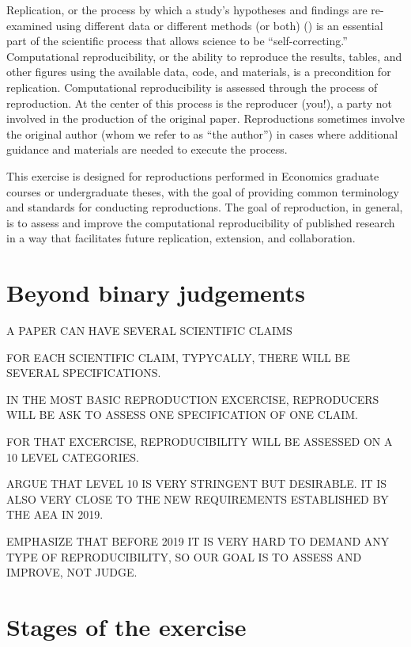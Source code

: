 \documentclass[]{book}
\begin{document}
Replication, or the process by which a study's hypotheses and findings are re-examined using different data or different methods (or both) (\citet{King95}) is an essential part of the scientific process that allows science to be ``self-correcting.'' Computational reproducibility, or the ability to reproduce the results, tables, and other figures using the available data, code, and materials, is a precondition for replication. Computational reproducibility is assessed through the process of reproduction. At the center of this process is the reproducer (you!), a party not involved in the production of the original paper. Reproductions sometimes involve the original author (whom we refer to as ``the author'') in cases where additional guidance and materials are needed to execute the process.

This exercise is designed for reproductions performed in Economics graduate courses or undergraduate theses, with the goal of providing common terminology and standards for conducting reproductions. The goal of reproduction, in general, is to assess and improve the computational reproducibility of published research in a way that facilitates future replication, extension, and collaboration.

\hypertarget{beyond-binary-judgements}{%
\section{Beyond binary judgements}\label{beyond-binary-judgements}}

A PAPER CAN HAVE SEVERAL SCIENTIFIC CLAIMS

FOR EACH SCIENTIFIC CLAIM, TYPYCALLY, THERE WILL BE SEVERAL SPECIFICATIONS.

IN THE MOST BASIC REPRODUCTION EXCERCISE, REPRODUCERS WILL BE ASK TO ASSESS ONE SPECIFICATION OF ONE CLAIM.

FOR THAT EXCERCISE, REPRODUCIBILITY WILL BE ASSESSED ON A 10 LEVEL CATEGORIES.

ARGUE THAT LEVEL 10 IS VERY STRINGENT BUT DESIRABLE. IT IS ALSO VERY CLOSE TO THE NEW REQUIREMENTS ESTABLISHED BY THE AEA IN 2019.

EMPHASIZE THAT BEFORE 2019 IT IS VERY HARD TO DEMAND ANY TYPE OF REPRODUCIBILITY, SO OUR GOAL IS TO ASSESS AND IMPROVE, NOT JUDGE.

\hypertarget{stages-of-the-exercise}{%
\section{Stages of the exercise}\label{stages-of-the-exercise}}
\end{document}
